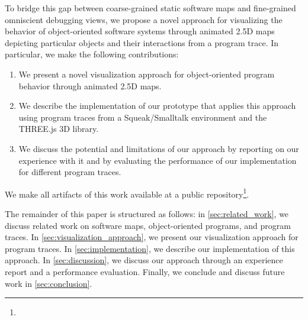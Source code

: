 To bridge this gap between coarse-grained static software maps and fine-grained omniscient debugging views, we propose a novel approach for visualizing the behavior of object-oriented software systems through animated 2.5D maps depicting particular objects and their interactions from a program trace.
In particular, we make the following contributions:

\begin{enumerate}
	\item We present a novel visualization approach for ob\-ject-ori\-ent\-ed program behavior through animated 2.5D maps.
	\item We describe the implementation of our prototype \tfd{} that applies this approach using program traces from a Squeak/\?Smalltalk environment and the THREE.js 3D library.
	\item We discuss the potential and limitations of our approach by reporting on our experience with it and by evaluating the performance of our implementation for different program traces.
\end{enumerate}

We make all artifacts of this work available at a public repository\footnote{}.

The remainder of this paper is structured as follows:
in \cref{sec:related_work}, we discuss related work on software maps, object-oriented programs, and program traces.
In \cref{sec:visualization_approach}, we present our visualization approach for program traces.
In \cref{sec:implementation}, we describe our implementation of this approach.
In \cref{sec:discussion}, we discuss our approach through an experience report and a performance evaluation.
Finally, we conclude and discuss future work in \cref{sec:conclusion}.
